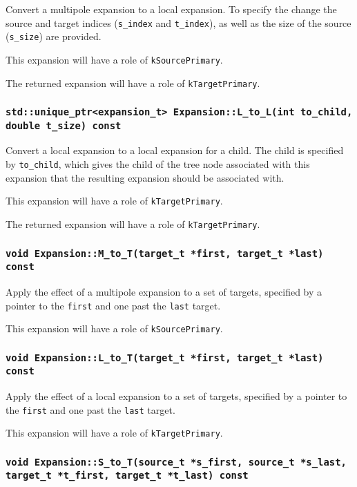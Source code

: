 Convert a multipole expansion to a local expansion. To specify the change the
source and target indices (\texttt{s\_index} and \texttt{t\_index}), as well
as the size of the source (\texttt{s\_size}) are provided.

This expansion will have a role of \texttt{kSourcePrimary}.

The returned expansion will have a role of \texttt{kTargetPrimary}.

\subsubsection{\texttt{std::unique\_ptr<expansion\_t> Expansion::L\_to\_L(int to\_child, double t\_size) const}}

Convert a local expansion to a local expansion for a child. The child is
specified by \texttt{to\_child}, which gives the child of the tree node
associated with this expansion that the resulting expansion should be
associated with.

This expansion will have a role of \texttt{kTargetPrimary}.

The returned expansion will have a role of \texttt{kTargetPrimary}.

\subsubsection{\texttt{void Expansion::M\_to\_T(target\_t *first, target\_t *last) const}}

Apply the effect of a multipole expansion to a set of targets, specified by
a pointer to the \texttt{first} and one past the \texttt{last} target.

This expansion will have a role of \texttt{kSourcePrimary}.

\subsubsection{\texttt{void Expansion::L\_to\_T(target\_t *first, target\_t *last) const}}

Apply the effect of a local expansion to a set of targets, specified by
a pointer to the \texttt{first} and one past the \texttt{last} target.

This expansion will have a role of \texttt{kTargetPrimary}.

\subsubsection{\texttt{void Expansion::S\_to\_T(source\_t *s\_first, source\_t *s\_last, target\_t *t\_first, target\_t *t\_last) const}}

